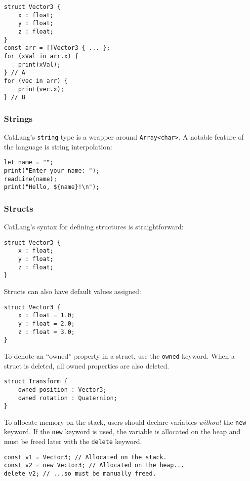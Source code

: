 \documentclass[12pt]{article}
\begin{document}
\begin{lstlisting}
struct Vector3 {
	x : float;
	y : float;
	z : float;
}
const arr = []Vector3 { ... };
for (xVal in arr.x) {
	print(xVal);
} // A
for (vec in arr) {
	print(vec.x);
} // B
\end{lstlisting}

\subsubsection{Strings}

CatLang's \lstinline!string! type is a wrapper around \lstinline!Array<char>!. A notable feature of the language is string interpolation:

\begin{lstlisting}
let name = "";
print("Enter your name: ");
readLine(name);
print("Hello, ${name}!\n");
\end{lstlisting}

\subsubsection{Structs}

CatLang's syntax for defining structures is straightforward:

\begin{lstlisting}
struct Vector3 {
	x : float;
	y : float;
	z : float;
}
\end{lstlisting}

Structs can also have default values assigned:

\begin{lstlisting}
struct Vector3 {
	x : float = 1.0;
	y : float = 2.0;
	z : float = 3.0;
}
\end{lstlisting}

To denote an ``owned'' property in a struct, use the \lstinline$owned$ keyword. When a struct is deleted, all owned properties are also deleted.

\begin{lstlisting}
struct Transform {
	owned position : Vector3;
	owned rotation : Quaternion;
}
\end{lstlisting}

To allocate memory on the stack, users should declare variables \emph{without} the \lstinline!new! keyword. If the \lstinline!new! keyword is used, the variable is allocated on the heap and must be freed later with the \lstinline!delete! keyword.

\begin{lstlisting}
const v1 = Vector3; // Allocated on the stack.
const v2 = new Vector3; // Allocated on the heap...
delete v2; // ...so must be manually freed.
\end{lstlisting}
\end{document}
